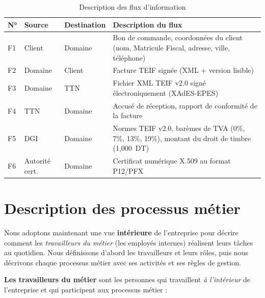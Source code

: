 \documentclass[a4paper,12pt]{report}
\begin{document}
\begin{table}[htbp]
\centering
\caption{Description des flux d'information}
\label{tab:flux}
\begin{tabularx}{\textwidth}{|l|l|l|X|}
\hline
\textbf{N°} & \textbf{Source} & \textbf{Destination} & \textbf{Description du flux} \\
\hline
F1 & Client & Domaine & Bon de commande, coordonnées du client (nom, Matricule Fiscal, adresse, ville, téléphone) \\
\hline
F2 & Domaine & Client & Facture TEIF signée (XML + version lisible) \\
\hline
F3 & Domaine & TTN & Fichier XML TEIF v2.0 signé électroniquement (XAdES-EPES) \\
\hline
F4 & TTN & Domaine & Accusé de réception, rapport de conformité de la facture \\
\hline
F5 & DGI & Domaine & Normes TEIF v2.0, barèmes de TVA (0\%, 7\%, 13\%, 19\%), montant du droit de timbre (1,000~DT) \\
\hline
F6 & Autorité cert. & Domaine & Certificat numérique X.509 au format P12/PFX \\
\hline
\end{tabularx}
\end{table}


\section{Description des processus métier}

Nous adoptons maintenant une vue \textbf{intérieure} de l'entreprise pour décrire comment les \textit{travailleurs du métier} (les employés internes) réalisent leurs tâches au quotidien. Nous définissons d'abord les travailleurs et leurs rôles, puis nous décrivons chaque processus métier avec ses activités et ses règles de gestion.

\textbf{Les travailleurs du métier} sont les personnes qui travaillent \textit{à l'intérieur} de l'entreprise et qui participent aux processus métier :
\end{document}
